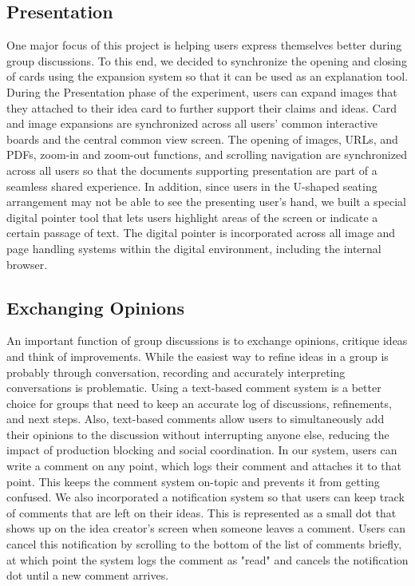 \documentclass{sigchi}
\begin{document}
\subsection{Presentation} One major focus of this project is helping users express themselves better during group discussions. To this end, we decided to synchronize the opening and closing of cards using the expansion system so that it can be used as an explanation tool. During the Presentation phase of the experiment, users can expand images that they attached to their idea card to further support their claims and ideas. Card and image expansions are synchronized across all users' common interactive boards and the central common view screen. The opening of images, URLs, and PDFs, zoom-in and zoom-out functions, and scrolling navigation are synchronized across all users so that the documents supporting presentation are part of a seamless shared experience. In addition, since users in the U-shaped seating arrangement may not be able to see the presenting user's hand, we built a special digital pointer tool that lets users highlight areas of the screen or indicate a certain passage of text. The digital pointer is incorporated across all image and page handling systems within the digital environment, including the internal browser.
\subsection{Exchanging Opinions} An important function of group discussions is to exchange opinions, critique ideas and think of improvements. While the easiest way to refine ideas in a group is probably through conversation, recording and accurately interpreting conversations is problematic. Using a text-based comment system is a better choice for groups that need to keep an accurate log of discussions, refinements, and next steps. Also, text-based comments allow users to simultaneously add their opinions to the discussion without interrupting anyone else, reducing the impact of production blocking and social coordination. 
In our system, users can write a comment on any point, which logs their comment and attaches it to that point. This keeps the comment system on-topic and prevents it from getting confused. We also incorporated a notification system so that users can keep track of comments that are left on their ideas. This is represented as a small dot that shows up on the idea creator's screen when someone leaves a comment. Users can cancel this notification by scrolling to the bottom of the list of comments briefly, at which point the system logs the comment as "read" and cancels the notification dot until a new comment arrives.
\end{document}
